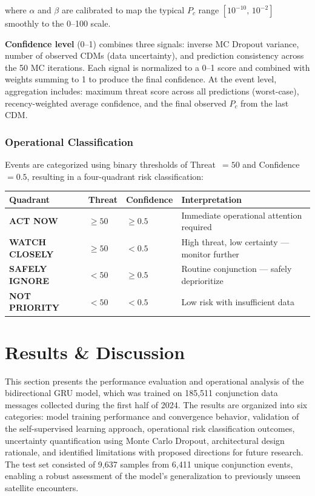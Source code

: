 \documentclass[12pt, a4paper]{article}
\begin{document}
\noindent where $\alpha$ and $\beta$ are calibrated to map the typical $P_c$ range $[10^{-10},\, 10^{-2}]$ smoothly to the 0--100 scale.

\textbf{Confidence level} (0--1) combines three signals: inverse MC Dropout variance, number of observed CDMs (data uncertainty), and prediction consistency across the 50 MC iterations. Each signal is normalized to a 0--1 score and combined with weights summing to 1 to produce the final confidence. At the event level, aggregation includes: maximum threat score across all predictions (worst-case), recency-weighted average confidence, and the final observed $P_c$ from the last CDM.

\subsubsection{Operational Classification}

Events are categorized using binary thresholds of Threat~$=50$ and Confidence~$=0.5$, resulting in a four-quadrant risk classification:

\begin{center}
\begin{tabular}{llll}
\toprule
\textbf{Quadrant} & \textbf{Threat} & \textbf{Confidence} & \textbf{Interpretation} \\
\midrule
\textbf{ACT NOW}       & $\geq 50$ & $\geq 0.5$ & Immediate operational attention required \\
\textbf{WATCH CLOSELY} & $\geq 50$ & $< 0.5$    & High threat, low certainty — monitor further \\
\textbf{SAFELY IGNORE} & $< 50$    & $\geq 0.5$ & Routine conjunction — safely deprioritize \\
\textbf{NOT PRIORITY}  & $< 50$    & $< 0.5$    & Low risk with insufficient data \\
\bottomrule
\end{tabular}
\end{center}

\section{Results \& Discussion}

This section presents the performance evaluation and operational analysis of the bidirectional GRU model, which was trained on 185,511 conjunction data messages collected during the first half of 2024. The results are organized into six categories: model training performance and convergence behavior, validation of the self-supervised learning approach, operational risk classification outcomes, uncertainty quantification using Monte Carlo Dropout, architectural design rationale, and identified limitations with proposed directions for future research. The test set consisted of 9,637 samples from 6,411 unique conjunction events, enabling a robust assessment of the model's generalization to previously unseen satellite encounters.
\end{document}
